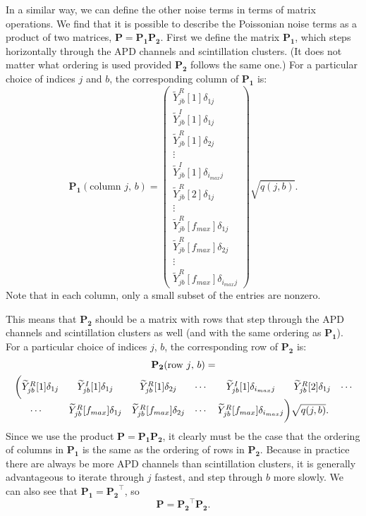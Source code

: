 In a similar way, we can define the other noise terms in terms of matrix operations.  We find that it is possible to describe the Poissonian noise terms as a product of two matrices, $\mathbf{P = P_1 P_2}$.  First we define the matrix $\mathbf{P_1}$, which steps horizontally through the APD channels and scintillation clusters.  (It does not matter what ordering is used provided $\mathbf{P_2}$ follows the same one.)  For a particular choice of indices $j$ and $b$, the corresponding column of $\mathbf{P_1}$ is:
\begin{equation}
\mathbf{P_1}(\text{column $j$, $b$}) = \begin{pmatrix}
\widetilde{Y}^R_{j b}[1] \delta_{1 j} \\
\widetilde{Y}^I_{j b}[1] \delta_{1 j} \\
\widetilde{Y}^R_{j b}[1] \delta_{2 j} \\
\vdots \\
\widetilde{Y}^I_{j b}[1] \delta_{i_{max} j} \\
\widetilde{Y}^R_{j b}[2] \delta_{1 j} \\
\vdots \\
\widetilde{Y}^R_{j b}[f_{max}] \delta_{1 j} \\
\widetilde{Y}^R_{j b}[f_{max}] \delta_{2 j} \\
\vdots \\
\widetilde{Y}^R_{j b}[f_{max}] \delta_{i_{max} j}
\end{pmatrix}\sqrt{q(j,b)}.
\end{equation}
Note that in each column, only a small subset of the entries are nonzero.

This means that $\mathbf{P_2}$ should be a matrix with rows that step through the APD channels and scintillation clusters as well (and with the same ordering as $\mathbf{P_1}$).  For a particular choice of indices $j$, $b$, the corresponding row of $\mathbf{P_2}$ is:
\begin{multline} \mathbf{P_2}(\text{row $j$, $b$}) = \\
\begin{matrix}
\bigg( \widetilde{Y}^R_{jb}[1]\delta_{1 j} & \widetilde{Y}^I_{j b}[1]\delta_{1 j} & \widetilde{Y}^R_{jb}[1]\delta_{2 j} & \cdots & \widetilde{Y}^I_{jb}[1]\delta_{i_{max} j} & \widetilde{Y}^R_{jb}[2]\delta_{1 j} & \cdots \\
\cdots & \widetilde{Y}^R_{jb}[f_{max}]\delta_{1 j} & \widetilde{Y}^R_{jb}[f_{max}]\delta_{2 j} & \cdots & \widetilde{Y}^R_{jb}[f_{max}]\delta_{i_{max} j}\rlap{$\bigg) \sqrt{q(j,b)}.$}
\end{matrix}\end{multline}
Since we use the product $\mathbf{P} = \mathbf{P_1 P_2}$, it clearly must be the case that the ordering of columns in $\mathbf{P_1}$ is the same as the ordering of rows in $\mathbf{P_2}$.  Because in practice there are always be more APD channels than scintillation clusters, it is generally advantageous to iterate through $j$ fastest, and step through $b$ more slowly.  We can also see that $\mathbf{P_1} = \mathbf{P_2}^{\top}$, so
\begin{equation}
\mathbf{P} = \mathbf{P_2}^{\top} \mathbf{P_2}.
\end{equation}

